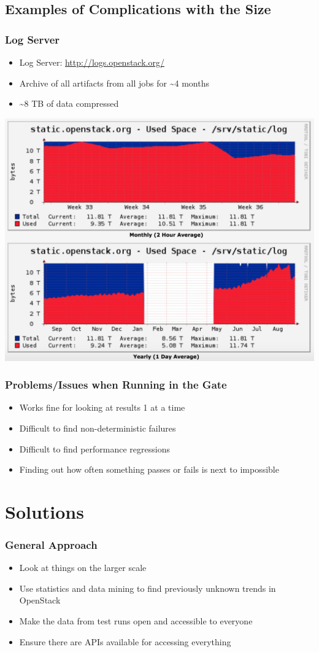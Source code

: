 \documentclass[aspectratio=169,11pt,hyperref={colorlinks=true}]{beamer}
\begin{document}
\subsection{Examples of Complications with the Size}
\begin{frame}
  \frametitle{Log Server}
  \begin{itemize}
    \item Log Server: \href{http://logs.openstack.org/}{http://logs.openstack.org/}
    \item Archive of all artifacts from all jobs for \textasciitilde4 months
    \item \textasciitilde8 TB of data compressed
  \end{itemize}
  \begin{center}
    \includegraphics[width=.55\textwidth]{cacti-static-openstack-org-log-graph.png}
  \end{center}
\end{frame}

\begin{frame}
  \frametitle{Problems/Issues when Running in the Gate}
  \begin{itemize}
    \item Works fine for looking at results 1 at a time
    \item Difficult to find non-deterministic failures
    \item Difficult to find performance regressions
    \item Finding out how often something passes or fails is next to impossible
  \end{itemize}
\end{frame}

\section{Solutions}
\begin{frame}
  \frametitle{General Approach}
    \begin{itemize}
        \item Look at things on the larger scale
        \item Use statistics and data mining to find previously unknown trends
            in OpenStack
        \item Make the data from test runs open and accessible to everyone
        \item Ensure there are APIs available for accessing everything
    \end{itemize}
\end{frame}
\end{document}
